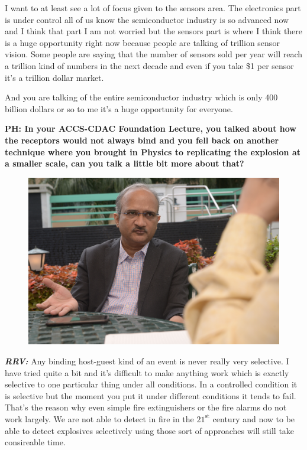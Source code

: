 \begin{multicols}{2}
I want to at least see a lot of focus given to the sensors area. The electronics part is under control all of us know the semiconductor industry is so advanced now and I think that part I am not worried but the sensors part is where I think there is a huge opportunity right now because people are talking of trillion sensor vision. Some people are saying that the number of sensors sold per year will reach a trillion kind of numbers in the next decade and even if you take \$1 per sensor it’s a trillion dollar market.

And you are talking of the entire semiconductor industry which is only 400 billion dollars or so to me it’s a huge opportunity for everyone.

\textbf{PH: In your ACCS-CDAC Foundation Lecture, you talked about how the receptors would not always bind and you fell back on another technique where you brought in Physics to replicating the explosion at a smaller scale, can you talk a little bit more about that?}

\begin{figure}[H]
\centering
\includegraphics[scale=.59]{src/Figures/interview/interview-fig13.jpg}
\end{figure}

\textbf{\textit{RRV:}} Any binding host-guest kind of an event is never really very selective. I have tried quite a bit and it’s difficult to make anything work which is exactly selective to one particular thing under all conditions. In a controlled condition it is selective but the moment you put it under different conditions it tends to fail. That’s the reason why even simple fire extinguishers or the fire alarms do not work largely. We are not able to detect in fire in the $21^{\text{st}}$ century and now to be able to detect explosives selectively using those sort of approaches will still take consireable time.


\end{multicols}
